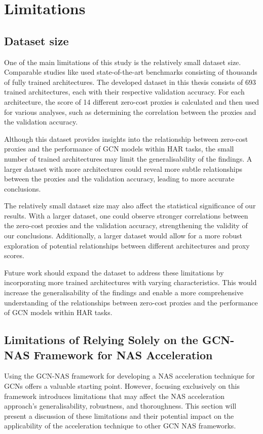 \section{Limitations}
\subsection{Dataset size}

One of the main limitations of this study is the relatively small dataset size. Comparable studies like \autocite{abdelfattah2021zero, colin2022adeeperlook} used state-of-the-art benchmarks consisting of thousands of fully trained architectures. The developed dataset in this thesis consists of 693 trained architectures, each with their respective validation accuracy. For each architecture, the score of 14 different zero-cost proxies is calculated and then used for various analyses, such as determining the correlation between the proxies and the validation accuracy.

Although this dataset provides insights into the relationship between zero-cost proxies and the performance of GCN models within HAR tasks, the small number of trained architectures may limit the generalisability of the findings. A larger dataset with more architectures could reveal more subtle relationships between the proxies and the validation accuracy, leading to more accurate conclusions.

The relatively small dataset size may also affect the statistical significance of our results. With a larger dataset, one could observe stronger correlations between the zero-cost proxies and the validation accuracy, strengthening the validity of our conclusions. Additionally, a larger dataset would allow for a more robust exploration of potential relationships between different architectures and proxy scores.

Future work should expand the dataset to address these limitations by incorporating more trained architectures with varying characteristics. This would increase the generalisability of the findings and enable a more comprehensive understanding of the relationships between zero-cost proxies and the performance of GCN models within HAR tasks.


\subsection{Limitations of Relying Solely on the GCN-NAS Framework for NAS Acceleration}

Using the GCN-NAS framework for developing a NAS acceleration technique for GCNs offers a valuable starting point. However, focusing exclusively on this framework introduces limitations that may affect the NAS acceleration approach's generalisability, robustness, and thoroughness. This section will present a discussion of these limitations and their potential impact on the applicability of the acceleration technique to other GCN NAS frameworks.


